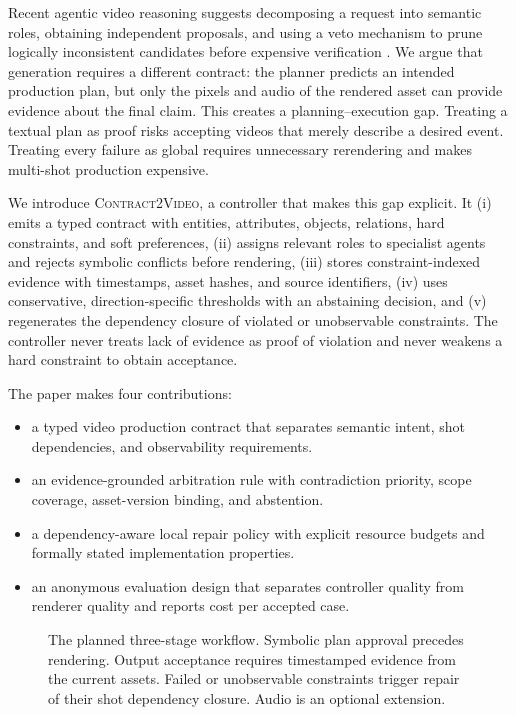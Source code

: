 \documentclass[11pt]{article}
\newcommand{\method}{\textsc{Contract2Video}}
\begin{document}
Recent agentic video reasoning suggests decomposing a request into semantic
roles, obtaining independent proposals, and using a veto mechanism to prune
logically inconsistent candidates before expensive verification
\citep{zhang-etal-2026-mavis}. We argue that generation requires a different contract:
the planner predicts an intended production plan, but only the pixels and audio
of the rendered asset can provide evidence about the final claim. This creates
a planning--execution gap. Treating a textual plan as proof risks accepting
videos that merely describe a desired event. Treating every failure as global
requires unnecessary rerendering and makes multi-shot production expensive.

We introduce \method, a controller that makes this gap explicit. It (i) emits
a typed contract with entities, attributes, objects, relations, hard
constraints, and soft preferences, (ii) assigns relevant roles to specialist
agents and rejects symbolic conflicts before rendering, (iii) stores
constraint-indexed evidence with timestamps, asset hashes, and source
identifiers, (iv) uses conservative, direction-specific thresholds with an
abstaining decision, and (v) regenerates the dependency closure of violated or
unobservable constraints. The controller never treats lack of evidence as
proof of violation and never weakens a hard constraint to obtain acceptance.

The paper makes four contributions:
\begin{itemize}[leftmargin=*,itemsep=1pt,topsep=2pt]
\item a typed video production contract that separates semantic intent,
shot dependencies, and observability requirements.
\item an evidence-grounded arbitration rule with contradiction priority,
scope coverage, asset-version binding, and abstention.
\item a dependency-aware local repair policy with explicit resource budgets
and formally stated implementation properties.
\item an anonymous evaluation design that separates controller
quality from renderer quality and reports cost per accepted case.
\end{itemize}

\begin{figure}[t]
\centering
{}
\caption{The planned three-stage workflow. Symbolic plan approval precedes
rendering. Output acceptance requires timestamped evidence from the current
assets. Failed or unobservable constraints trigger repair of their shot
dependency closure. Audio is an optional extension.}
\label{fig:architecture}
\end{figure}
\end{document}
